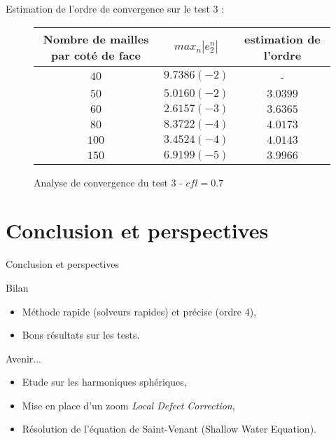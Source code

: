 \documentclass[11pt]{beamer}
\begin{document}
\begin{frame}

Estimation de l'ordre de convergence sur le test 3 :

\begin{figure}
\begin{tabular}{ccc}
Nombre de mailles par coté de face & $max_n |e_2^n|$ & estimation de l'ordre \\
\hline
\hline
$40$ & $9.7386 (-2)$ & - \\
\hline 
$50$ & $5.0160 (-2)$ & $3.0399$ \\
\hline
$60$ & $2.6157 (-3)$ & $3.6365$ \\
\hline
$80$ & $8.3722 (-4)$ & $4.0173$ \\
\hline
$100$ & $3.4524 (-4)$ & $4.0143$\\
\hline
$150$ & $6.9199 (-5)$ & $3.9966$
\end{tabular}
\caption{Analyse de convergence du test 3 - $cfl = 0.7$}
\end{figure}

\end{frame}


\section{Conclusion et perspectives}
\begin{frame}{Conclusion et perspectives}
\begin{block}{Bilan}
\begin{itemize}
\item Méthode rapide (solveurs rapides) et précise (ordre 4),

\item Bons résultats sur les tests.
\end{itemize}
\end{block}

\pause

\begin{block}{Avenir...}
\begin{itemize}
\item Etude sur les harmoniques sphériques,

\item Mise en place d'un zoom \textit{Local Defect Correction},

\item Résolution de l'équation de Saint-Venant (Shallow Water Equation).
\end{itemize}
\end{block}
\end{frame}
\end{document}
